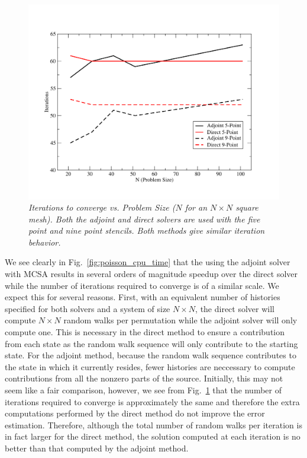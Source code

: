 \documentclass[preprint,12pt]{elsarticle}
\begin{document}
\begin{figure}[h!]
  \centering
  \includegraphics[width=5in,clip]{Adjoint_Direct_Iterations.pdf}
  \caption{\sl Iterations to converge vs. Problem Size ($N$ for an $N
    \times N$ square mesh). Both the adjoint and direct solvers are
    used with the five point and nine point stencils. Both methods
    give similar iteration behavior.}
  \label{fig:poisson_iterations}
\end{figure}

We see clearly in Fig.~\ref{fig:poisson_cpu_time} that the using the adjoint
solver with MCSA results in several orders of magnitude speedup over the
direct solver while the number of iterations required to converge is of a
similar scale. We expect this for several reasons. First, with an equivalent
number of histories specified for both solvers and a system of size $N \times
N$, the direct solver will compute $N \times N$ random walks per permutation
while the adjoint solver will only compute one. This is necessary in the
direct method to ensure a contribution from each state as the random walk
sequence will only contribute to the starting state. For the adjoint method,
because the random walk sequence contributes to the state in which it
currently resides, fewer histories are neccessary to compute contributions
from all the nonzero parts of the source. Initially, this may not seem like a
fair comparison, however, we see from Fig.~\ref{fig:poisson_iterations} that
the number of iterations required to converge is approximately the same and
therefore the extra computations performed by the direct method do not improve
the error estimation. Therefore, although the total number of random walks per
iteration is in fact larger for the direct method, the solution computed at
each iteration is no better than that computed by the adjoint method.
\end{document}
